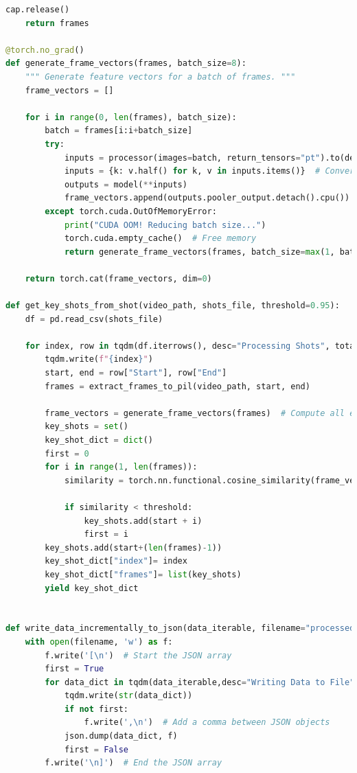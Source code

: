\documentclass[12pt]{report}
\begin{document}
\begin{lstlisting}[language=Python,caption={Key Shot Frame Extraction Code}]
    cap.release()
    return frames

@torch.no_grad()
def generate_frame_vectors(frames, batch_size=8):
    """ Generate feature vectors for a batch of frames. """
    frame_vectors = []
    
    for i in range(0, len(frames), batch_size):
        batch = frames[i:i+batch_size]
        try:
            inputs = processor(images=batch, return_tensors="pt").to(device, non_blocking=True)
            inputs = {k: v.half() for k, v in inputs.items()}  # Convert inputs to fp16
            outputs = model(**inputs)
            frame_vectors.append(outputs.pooler_output.detach().cpu())  # Move to CPU after computation
        except torch.cuda.OutOfMemoryError:
            print("CUDA OOM! Reducing batch size...")
            torch.cuda.empty_cache()  # Free memory
            return generate_frame_vectors(frames, batch_size=max(1, batch_size // 2))  # Try smaller batch
    
    return torch.cat(frame_vectors, dim=0)

def get_key_shots_from_shot(video_path, shots_file, threshold=0.95):
    df = pd.read_csv(shots_file)
    
    for index, row in tqdm(df.iterrows(), desc="Processing Shots", total=len(df)):
        tqdm.write(f"{index}")
        start, end = row["Start"], row["End"]
        frames = extract_frames_to_pil(video_path, start, end)

        frame_vectors = generate_frame_vectors(frames)  # Compute all embeddings at once
        key_shots = set()
        key_shot_dict = dict()
        first = 0
        for i in range(1, len(frames)):
            similarity = torch.nn.functional.cosine_similarity(frame_vectors[first], frame_vectors[i], dim=0).item()

            if similarity < threshold:
                key_shots.add(start + i)
                first = i
        key_shots.add(start+(len(frames)-1))
        key_shot_dict["index"]= index
        key_shot_dict["frames"]= list(key_shots)
        yield key_shot_dict

        
def write_data_incrementally_to_json(data_iterable, filename="processed_data_1.json"):
    with open(filename, 'w') as f:
        f.write('[\n')  # Start the JSON array
        first = True
        for data_dict in tqdm(data_iterable,desc="Writing Data to File"):
            tqdm.write(str(data_dict))
            if not first:
                f.write(',\n')  # Add a comma between JSON objects
            json.dump(data_dict, f)
            first = False
        f.write('\n]')  # End the JSON array


\end{lstlisting}
\end{document}
